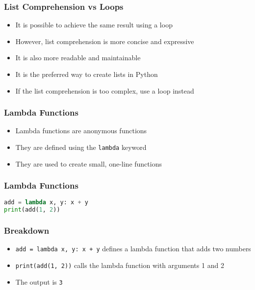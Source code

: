 \documentclass[serif, 9pt, aspectratio=32]{beamer}
\begin{document}
\begin{frame}
    \centering
    \frametitle{List Comprehension vs Loops}
    \begin{itemize}
        \setlength{\itemsep}{2em}
        \item It is possible to achieve the same result using a loop
        \item However, list comprehension is more concise and expressive
        \item It is also more readable and maintainable
        \item It is the preferred way to create lists in Python
        \item If the list comprehension is too complex, use a loop instead
    \end{itemize}
\end{frame}

\begin{frame}
    \centering
    \frametitle{Lambda Functions}
    \begin{itemize}
        \setlength{\itemsep}{2em}
        \item Lambda functions are anonymous functions
        \item They are defined using the \texttt{lambda} keyword
        \item They are used to create small, one-line functions
    \end{itemize}
\end{frame}

\begin{frame}[fragile]
    \frametitle{Lambda Functions}
    \begin{lstlisting}[language=Python]
add = lambda x, y: x + y
print(add(1, 2))
    \end{lstlisting}
\end{frame}

\begin{frame}
    \centering
    \frametitle{Breakdown}
    \begin{itemize}
        \setlength{\itemsep}{2em}
        \item \texttt{add = lambda x, y: x + y} defines a lambda function that adds two numbers
        \item \texttt{print(add(1, 2))} calls the lambda function with arguments 1 and 2
        \item The output is \texttt{3}
    \end{itemize}
\end{frame}
\end{document}
